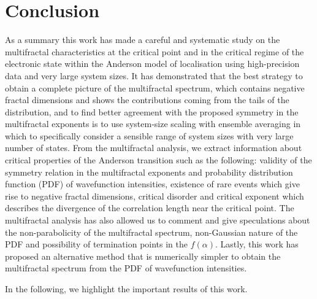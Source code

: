 
\chapter{Conclusion}

As a summary this work has made a careful and systematic study on the multifractal characteristics at the critical point and in the critical regime of the electronic state within the Anderson model of localisation using high-precision data and very large system sizes.  It has demonstrated that the best strategy to obtain a complete picture of the multifractal spectrum, which contains negative fractal dimensions and shows the contributions coming from the tails of the distribution, and to find better agreement with the proposed symmetry in the multifractal exponents is to use system-size scaling with ensemble averaging in which to specifically consider a sensible range of system sizes with very large number of states.
From the multifractal analysis, we extract information about critical properties of the Anderson transition such as the following: validity of the symmetry relation in the multifractal exponents and probability distribution function (PDF) of wavefunction intensities, existence of rare events which give rise to negative fractal dimensions, critical disorder and critical exponent which describes the divergence of the correlation length near the critical point.  The multifractal analysis has also allowed us to comment and give speculations about the non-parabolicity of the multifractal spectrum, non-Gaussian nature of the PDF and possibility of termination points in the $f(\alpha)$.  Lastly, this work has proposed an alternative method that is numerically simpler to obtain the multifractal spectrum from the PDF of wavefunction intensities.

In the following, we highlight the important results of this work.

